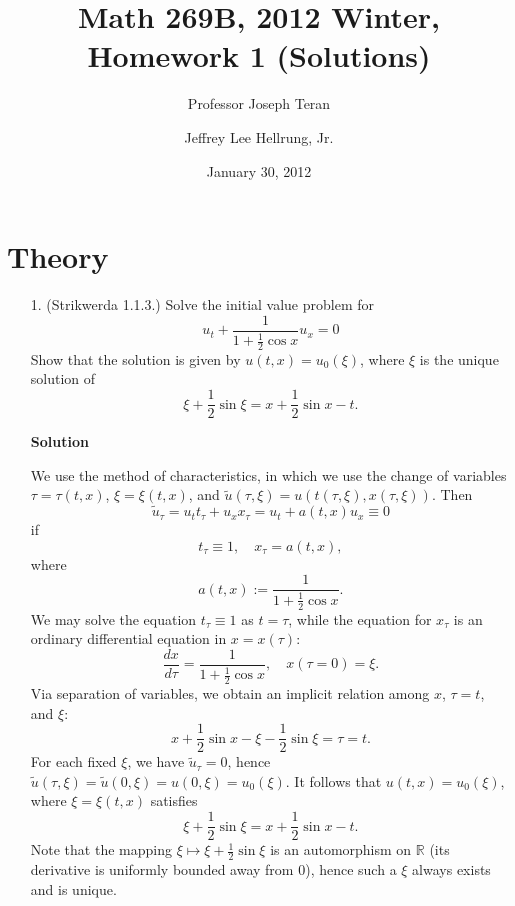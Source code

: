 \documentclass{article}
\begin{document}
\title{Math 269B, 2012 Winter, Homework 1 (Solutions)}
\date{January 30, 2012}
\author{Professor Joseph Teran \and Jeffrey Lee Hellrung, Jr.}
\maketitle

\section{Theory}

\begin{itemize}

\item[1.] (Strikwerda 1.1.3.) Solve the initial value problem for
\begin{equation*}
u_t + \frac{1}{1 + \frac{1}{2} \cos x} u_x = 0
\end{equation*}
Show that the solution is given by $u(t,x) = u_0(\xi)$, where $\xi$ is the unique solution of
\begin{equation*}
\xi + \frac{1}{2} \sin \xi = x + \frac{1}{2} \sin x - t.
\end{equation*}

\textbf{Solution}

We use the method of characteristics, in which we use the change of variables $\tau = \tau(t,x)$, $\xi = \xi(t,x)$, and $\tilde{u}(\tau,\xi) = u \left( t(\tau,\xi), x(\tau,\xi) \right)$. Then
\begin{equation*}
\tilde{u}_{\tau} = u_t t_{\tau} + u_x x_{\tau} = u_t + a(t,x) u_x \equiv 0
\end{equation*}
if
\begin{equation*}
t_{\tau} \equiv 1, \quad x_{\tau} = a(t,x),
\end{equation*}
where
\begin{equation*}
a(t,x) := \frac{1}{1 + \frac{1}{2} \cos x}.
\end{equation*}
We may solve the equation $t_{\tau} \equiv 1$ as $t = \tau$, while the equation for $x_{\tau}$ is an ordinary differential equation in $x= x(\tau)$:
\begin{equation*}
\frac{dx}{d\tau} = \frac{1}{1 + \frac{1}{2} \cos x}, \quad x(\tau = 0) = \xi.
\end{equation*}
Via separation of variables, we obtain an implicit relation among $x$, $\tau = t$, and $\xi$:
\begin{equation*}
x + \frac{1}{2} \sin x - \xi - \frac{1}{2} \sin \xi = \tau = t.
\end{equation*}
For each fixed $\xi$, we have $\tilde{u}_{\tau} = 0$, hence $\tilde{u}(\tau,\xi) = \tilde{u}(0,\xi) = u(0,\xi) = u_0(\xi)$. It follows that $u(t,x) = u_0(\xi)$, where $\xi = \xi(t,x)$ satisfies
\begin{equation*}
\xi + \frac{1}{2} \sin \xi = x + \frac{1}{2} \sin x - t.
\end{equation*}
Note that the mapping $\xi \mapsto \xi + \frac{1}{2} \sin \xi$ is an automorphism on $\mathbb{R}$ (its derivative is uniformly bounded away from $0$), hence such a $\xi$ always exists and is unique.


\end{itemize}
\end{document}
